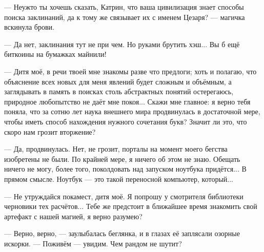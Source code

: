 --- Неужто ты хочешь сказать, Катрин, что ваша цивилизация знает способы поиска заклинаний,
да к тому же связывает их с именем Цезаря? --- магичка вскинула брови.

--- Да нет, заклинания тут не при чем. Но руками брутить хэш... Вы б ещё биткоины на бумажках майнили!

--- Дитя моё, в речи твоей мне знакомы разве что предлоги;
хоть и полагаю, что объяснение всех новых для меня явлений будет сложным и объёмным,
а заглядывать в память в поисках столь абстрактных понятий остерегаюсь, природное любопытство не даёт мне покоя...
Скажи мне главное: я верно тебя поняла, что за сотню лет наука внешнего мира продвинулась в достаточной мере,
чтобы иметь способ нахождения нужного сочетания букв? Значит ли это, что скоро нам грозит вторжение?

--- Да, продвинулась. Нет, не грозит, порталы на момент моего бегства изобретены не были.
По крайней мере, я ничего об этом не знаю. Обещать ничего не могу, более того, поколдовать над запуском ноутбука придётся...
В прямом смысле. Ноутбук --- это такой переносной компьютер, который...

--- Не утруждайся покамест, дитя моё. Я попрошу у смотрителя библиотеки черновики тех расчётов...
Тебе же предстоит в ближайшее время знакомить свой артефакт с нашей магией, я верно разумею?

--- Верно, верно, --- заулыбалась беглянка, и в глазах её заплясали озорные искорки.
--- Поживём --- увидим. Чем рандом не шутит?
